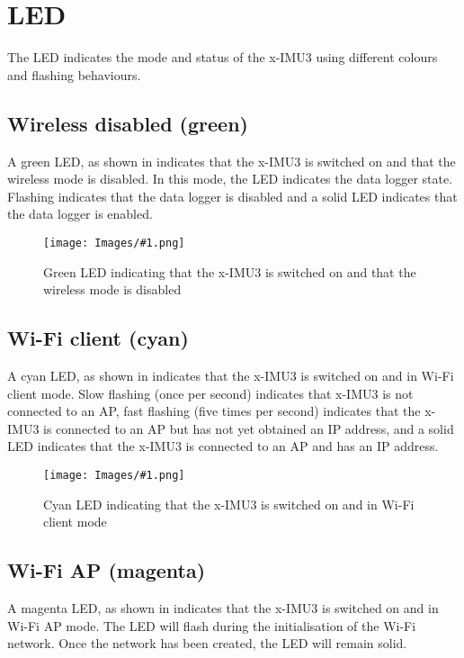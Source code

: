 \section{\acs{LED}}
\label{sec:led}

The \ac{LED} indicates the mode and status of the x-IMU3 using different colours and flashing behaviours.

\newcommand{\ledFigure}[2]{
    \begin{figure}[H]
        \centering
        \texttt{[image: Images/\#1.png]}
        \caption{#2}
        \label{fig:#1}
    \end{figure}
}

\subsection{Wireless disabled (green)}

A green \ac{LED}, as shown in  indicates that the x-IMU3 is switched on and that the wireless mode is disabled.  In this mode, the \ac{LED} indicates the data logger state.  Flashing indicates that the data logger is disabled and a solid \ac{LED} indicates that the data logger is enabled.

\ledFigure{greenLed}{Green \acs{LED} indicating that the x-IMU3 is switched on and that the wireless mode is disabled}

\subsection{Wi-Fi client (cyan)}

A cyan \ac{LED}, as shown in  indicates that the x-IMU3 is switched on and in Wi-Fi client mode. Slow flashing (once per second) indicates that x-IMU3 is not connected to an \ac{AP}, fast flashing (five times per second) indicates that the x-IMU3 is connected to an \ac{AP} but has not yet obtained an \ac{IP} address, and a solid \ac{LED} indicates that the x-IMU3 is connected to an \ac{AP} and has an \ac{IP} address.

\ledFigure{cyanLed}{Cyan \acs{LED} indicating that the x-IMU3 is switched on and in Wi-Fi client mode}

\subsection{Wi-Fi AP (magenta)}

A magenta \ac{LED}, as shown in  indicates that the x-IMU3 is switched on and in Wi-Fi \ac{AP} mode.  The \ac{LED} will flash during the initialisation of the Wi-Fi network.  Once the network has been created, the \ac{LED} will remain solid.

